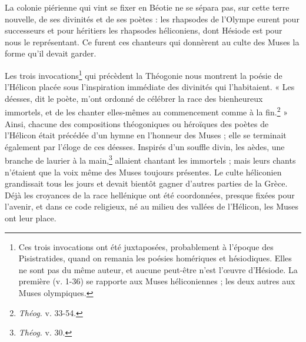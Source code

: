 \documentclass[landscape, a4paper, 11pt, oneside, polutonikogreek, french]{article}
\begin{document}
La colonie piérienne qui vint se fixer en Béotie ne se sépara pas, sur cette terre nouvelle, de ses divinités et de ses poètes : les rhapsodes de l'Olympe eurent pour successeurs et pour héritiers les rhapsodes héliconiens, dont Hésiode est pour nous le représentant. Ce furent ces chanteurs qui donnèrent au culte des Muses la forme qu'il devait garder.

Les trois invocations\footnote{Ces trois invocations ont été juxtaposées, probablement à l'époque des Pisistratides, quand on remania les poésies homériques et hésiodiques. Elles ne sont pas du même auteur, et aucune peut-être n'est l'œuvre d'Hésiode. La première (v. 1-36) se rapporte aux Muses héliconiennes ; les deux autres aux Muses olympiques.} qui précèdent la Théogonie nous montrent la poésie de l'Hélicon placée sous l'inspiration immédiate des divinités qui l'habitaient. « Les déesses, dit le poète, m'ont ordonné de célébrer la race des bienheureux immortels, et de les chanter elles-mêmes au commencement comme à la fin.\footnote{\emph{Théog.} v. 33-54.} » Ainsi, chacune des compositions théogoniques ou héroïques des poètes de l'Hélicon était précédée d'un hymne en l'honneur des Muses ; elle se terminait également par l'éloge de ces déesses. Inspirés d'un souffle divin, les aèdes, une branche de laurier à la main,\footnote{\emph{Théog.} v. 30.} allaient chantant les immortels ; mais leurs chants n'étaient que la voix même des Muses toujours présentes. Le culte héliconien grandissait tous les jours et devait bientôt gagner d'autres parties de la Grèce. Déjà les croyances de la race hellénique ont été coordonnées, presque fixées pour l'avenir, et dans ce code religieux, né au milieu des vallées de l'Hélicon, les Muses ont leur place.
\end{document}
